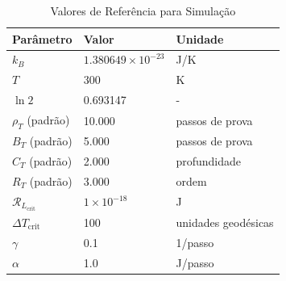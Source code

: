 \documentclass[11pt,a4paper]{article}
\newcommand{\rhoT}{\rho_T}
\newcommand{\BT}{B_T}
\newcommand{\CT}{C_T}
\newcommand{\RT}{R_T}
\newcommand{\DeltaT}{\Delta T}
\newcommand{\RL}{\mathcal{R}_L}
\newcommand{\kB}{k_B}
\begin{document}
\begin{table}[htbp]
\centering
\caption{Valores de Referência para Simulação}
\label{tab:params}
\begin{tabular}{@{}lll@{}}
\toprule
\textbf{Parâmetro} & \textbf{Valor} & \textbf{Unidade} \\
\midrule
$\kB$ & $1.380649 \times 10^{-23}$ & J/K \\
$T$ & 300 & K \\
$\ln 2$ & 0.693147 & - \\
$\rhoT$ (padrão) & 10.000 & passos de prova \\
$\BT$ (padrão) & 5.000 & passos de prova \\
$\CT$ (padrão) & 2.000 & profundidade \\
$\RT$ (padrão) & 3.000 & ordem \\
$\RL_{\text{crit}}$ & $1 \times 10^{-18}$ & J \\
$\DeltaT_{\text{crit}}$ & 100 & unidades geodésicas \\
$\gamma$ & 0.1 & 1/passo \\
$\alpha$ & 1.0 & J/passo \\
\bottomrule
\end{tabular}
\end{table}
\end{document}
